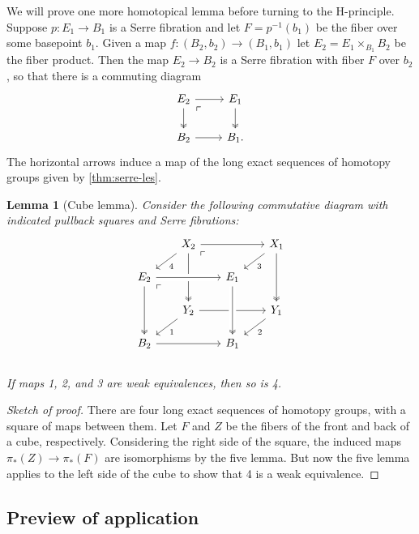 \documentclass{article}
\newtheorem{lemma}[theorem]{Lemma}
\newtheorem{proposed work}[theorem]{Proposed Work}
\begin{document}
We will prove one more homotopical lemma before turning to the
H-principle. Suppose $p: E_1\to B_1$ is a Serre fibration and let
$F = p^{-1}(b_1)$ be the fiber over some basepoint $b_1$. Given a map
$f: (B_2,b_2) \to (B_1,b_1)$ let $E_2 = E_1\times_{B_1} B_2$ be the
fiber product. Then the map $E_2 \to B_2$ is a Serre fibration with
fiber $F$ over $b_2$, so that there is a commuting diagram
\[
\begin{tikzcd}
E_2 \arrow[r] \arrow[d,two heads] \arrow[dr, phantom, "\ulcorner", very near start]
& E_1 \arrow[d, two heads] 
\\
B_2 \arrow[r]
& B_1.
\end{tikzcd}
\]
The horizontal arrows induce a map of the long exact sequences of
homotopy groups given by \ref{thm:serre-les}.

\begin{lemma}[Cube lemma] Consider the following commutative diagram with
  indicated pullback squares and Serre fibrations:
  \[
    \begin{tikzcd}[row sep=scriptsize, column sep=scriptsize]
      & X_2 \arrow[dl,"4"] \arrow[rr] \arrow[dd, two heads] \arrow[dr,
      phantom, "\ulcorner", very near start] & & X_1 \arrow[dl,"3"]
      \arrow[dd, two heads] \\
      E_2 \arrow[rr, crossing over] \arrow[dd, two heads] \arrow[dr,
      phantom, "\ulcorner", very near start] & & E_1 \\
      & Y_2 \arrow[dl,"1"] \arrow[rr] & & Y_1 \arrow[dl,"2"] \\
      B_2 \arrow[rr] & & B_1 \arrow[from=uu, crossing over, two heads]\\
    \end{tikzcd}
  \]
  If maps 1, 2, and 3 are weak equivalences, then so is 4.
\end{lemma}

\begin{proof}[Sketch of proof]
  There are four long exact sequences of homotopy groups, with a
  square of maps between them. Let $F$ and $Z$ be the fibers of the
  front and back of a cube, respectively. Considering the right side
  of the square, the induced maps $\pi_*(Z)\to \pi_*(F)$ are
  isomorphisms by the five lemma. But now the five lemma applies to
  the left side of the cube to show that 4 is a weak equivalence.
\end{proof}

\subsection{Preview of application}
\end{document}
